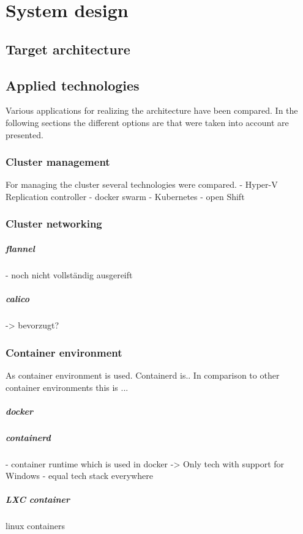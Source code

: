 \chapter{System design} %

\label{chap:design} %



\section{Target architecture}


\section{Applied technologies}
Various applications for realizing the architecture have been compared. In the following sections the different options are that were taken into account are presented.


\subsection{Cluster management}
For managing the cluster several technologies were compared. 
- Hyper-V Replication controller
- docker swarm
- Kubernetes
- open Shift

\subsection{Cluster networking}
\paragraph{flannel}
- noch nicht vollständig ausgereift

\paragraph{calico}
-> bevorzugt?

\subsection{Container environment}
As container environment  is used. Containerd is..
In comparison to other container environments this is ...

\paragraph{docker}
\paragraph{containerd}
	- container runtime which is used in docker
	-> Only tech with support for Windows - equal tech stack everywhere
\paragraph{LXC container}
	linux containers
